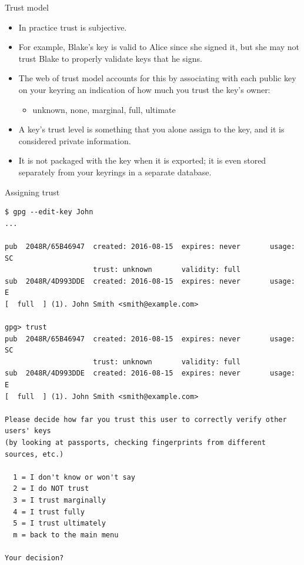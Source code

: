 \documentclass[%
mode=present,%
paper=smartboard,
size=20pt,
]{powerdot}
\begin{document}
\begin{slide}{Trust model}
  \begin{itemize}
  \item In practice trust is subjective.
  \item For example, Blake's key is valid to Alice since she signed
    it, but she may not trust Blake to properly validate keys that he
    signs.
  \item The web of trust model accounts for this by associating with
    each public key on your keyring an indication of how much you
    trust the key's owner:
    \begin{itemize}
    \item unknown, none, marginal, full, ultimate
    \end{itemize}
  \item A key's trust level is something that you alone assign to the
    key, and it is considered private information.
  \item It is not packaged with the key when it is exported; it is
    even stored separately from your keyrings in a separate database.
  \end{itemize}
\end{slide}

\makeatletter\renewcommand{\verbatim@font}{\scriptsize\tt}\makeatother
\begin{slide}[method=direct]{Assigning trust}
\vspace{-10mm}
\begin{verbatim}
$ gpg --edit-key John
...

pub  2048R/65B46947  created: 2016-08-15  expires: never       usage: SC  
                     trust: unknown       validity: full
sub  2048R/4D993DDE  created: 2016-08-15  expires: never       usage: E   
[  full  ] (1). John Smith <smith@example.com>

gpg> trust
pub  2048R/65B46947  created: 2016-08-15  expires: never       usage: SC  
                     trust: unknown       validity: full
sub  2048R/4D993DDE  created: 2016-08-15  expires: never       usage: E   
[  full  ] (1). John Smith <smith@example.com>

Please decide how far you trust this user to correctly verify other users' keys
(by looking at passports, checking fingerprints from different sources, etc.)

  1 = I don't know or won't say
  2 = I do NOT trust
  3 = I trust marginally
  4 = I trust fully
  5 = I trust ultimately
  m = back to the main menu

Your decision?
\end{verbatim}
\end{slide}
\end{document}

